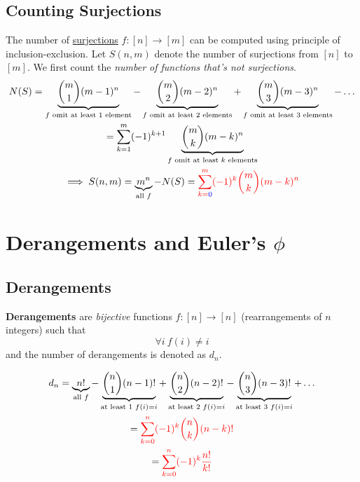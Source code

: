 \documentclass{article}
\begin{document}
			\subsection{Counting Surjections}
				\begin{theorem}
					The number of \ul{surjections} $f: [n] \to [m]$ can be computed using principle of inclusion-exclusion. Let $S(n, m)$ denote the number of surjections from $[n]$ to $[m]$. We first count the \emph{number of functions that's not surjections}.
					\begin{gather}
						N(S) = \underbrace{\binom{m}{1} (m-1)^n}_{f \text{{ omit at least 1 element}}} 
						- \underbrace{\binom{m}{2} (m-2)^n}_{f \text{{ omit at least 2 elements}}}
						+ \underbrace{\binom{m}{3} (m-3)^n}_{f \text{{ omit at least 3 elements}}} - \dots \\
						= \sum_{k=1}^m (-1)^{k+1} \underbrace{\binom{m}{k} (m-k)^n}_{f \text{{ omit at least $k$ elements}}} \\
					\implies S(n, m) = \underbrace{m^n}_{\text{{all }} f} - N(S) = \textcolor{red}{\sum_{k=\textcolor{blue}{0}}^m (-1)^{k} \binom{m}{k} (m-k)^n}
					\end{gather}
				\end{theorem}
				
		\section{Derangements and Euler's $\phi$}
			\subsection{Derangements}
				\begin{definition}
					\textbf{Derangements} are \emph{bijective} functions $f:[n] \to [n]$ (rearrangements of $n$ integers) such that 
					\begin{equation}
						\forall i\ f(i) \neq i
					\end{equation}
					and the number of derangements is denoted as $d_n$.
				\end{definition}
				
				\begin{theorem}
					\begin{gather}
						d_n = 
						\underbrace{n!}_{\text{{all }}f}
						- \underbrace{\binom{n}{1} (n-1)!}_{\text{{at least 1 }}f(i) = i}
						+ \underbrace{\binom{n}{2} (n-2)!}_{\text{{at least 2 }}f(i) = i}
						- \underbrace{\binom{n}{3} (n-3)!}_{\text{{at least 3 }}f(i) = i} + \dots \\
						= \textcolor{red}{\sum_{k=0}^n (-1)^k \binom{n}{k}(n-k)!} \\
						= \textcolor{red}{\sum_{k=0}^n (-1)^k \frac{n!}{k!}}
					\end{gather}
				\end{theorem}
				
\end{document}
